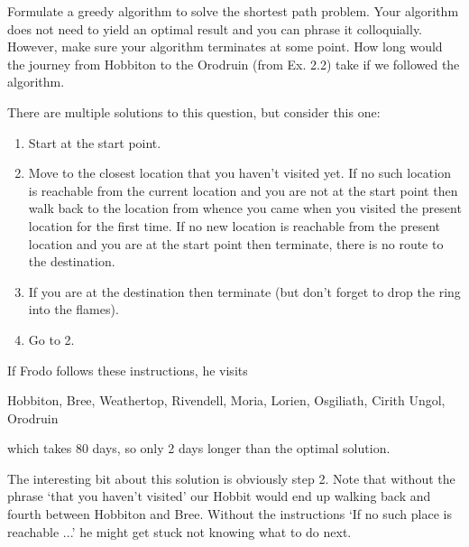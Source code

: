 
Formulate a greedy algorithm to solve the shortest path problem. Your algorithm does not need to yield an optimal result and you can phrase it colloquially. However, make sure your algorithm terminates at some point. How long would the journey from Hobbiton to the Orodruin (from Ex. 2.2) take if we followed the algorithm. 

\solution
There are multiple solutions to this question, but consider this one:
\begin{enumerate}[label=\arabic*.]
    \item Start at the start point. 
    \item Move to the closest location that you haven't visited yet. If no such location is reachable from the current location and you are not at the start point then walk back to the location from whence you came when you visited the present location for the first time. If no new location is reachable from the present location and you are at the start point then terminate, there is no route to the destination.
    \item If you are at the destination then terminate (but don't forget to drop the ring into the flames).
    \item Go to 2.
\end{enumerate}

\noindent{}If Frodo follows these instructions, he visits
\begin{center}
Hobbiton, Bree, Weathertop, Rivendell, Moria, Lorien, Osgiliath, Cirith Ungol, Orodruin 
\end{center}
which takes 80 days, so only 2 days longer than the optimal solution.

The interesting bit about this solution is obviously step 2. Note that without the phrase `that you haven't visited' our Hobbit would end up walking back and fourth between Hobbiton and Bree. Without the instructions `If no such place is reachable ...' he might get stuck not knowing what to do next. 
